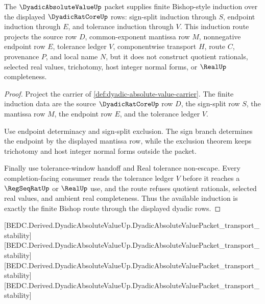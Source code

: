 \begin{theorem}
\label{thm:dyadic-absolute-value-bishop-induction-gap}
The $\DyadicAbsoluteValueUp$ packet supplies finite Bishop-style induction over the displayed $\DyadicRatCoreUp$ rows: sign-split induction through $S$, endpoint induction through $E$, and tolerance induction through $V$. This induction route projects the source row $D$, common-exponent mantissa row $M$, nonnegative endpoint row $E$, tolerance ledger $V$, componentwise transport $H$, route $C$, provenance $P$, and local name $N$, but it does not construct quotient rationals, selected real values, trichotomy, host integer normal forms, or $\RealUp$ completeness.
\end{theorem}
\begin{proof}
Project the carrier of \autoref{def:dyadic-absolute-value-carrier}. The finite induction data are the source $\DyadicRatCoreUp$ row $D$, the sign-split row $S$, the mantissa row $M$, the endpoint row $E$, and the tolerance ledger $V$.

Use endpoint determinacy and sign-split exclusion. The sign branch determines the endpoint by the displayed mantissa row, while the exclusion theorem keeps trichotomy and host integer normal forms outside the packet.

Finally use tolerance-window handoff and Real tolerance non-escape. Every completion-facing consumer reads the tolerance ledger $V$ before it reaches a $\RegSeqRatUp$ or $\RealUp$ use, and the route refuses quotient rationals, selected real values, and ambient real completeness. Thus the available induction is exactly the finite Bishop route through the displayed dyadic rows.
\end{proof}

[BEDC.Derived.DyadicAbsoluteValueUp.DyadicAbsoluteValuePacket\_transport\_stability]
[BEDC.Derived.DyadicAbsoluteValueUp.DyadicAbsoluteValuePacket\_transport\_stability]
[BEDC.Derived.DyadicAbsoluteValueUp.DyadicAbsoluteValuePacket\_transport\_stability]
[BEDC.Derived.DyadicAbsoluteValueUp.DyadicAbsoluteValuePacket\_transport\_stability]

